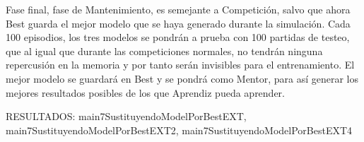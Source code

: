 Fase final, fase de Mantenimiento, es semejante a Competición, salvo que ahora Best guarda el mejor modelo que se haya generado durante la simulación. Cada 100 episodios, los tres modelos se pondrán a prueba con 100 partidas de testeo, que al igual que durante las competiciones normales, no tendrán ninguna repercusión en la memoria y por tanto serán invisibles para el entrenamiento. El mejor modelo se guardará en Best y se pondrá como Mentor, para así generar los mejores resultados posibles de los que Aprendiz pueda aprender.  

RESULTADOS: 	main7SustituyendoModelPorBestEXT, main7SustituyendoModelPorBestEXT2, main7SustituyendoModelPorBestEXT4












